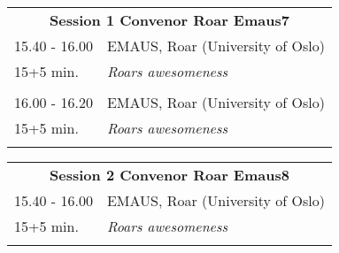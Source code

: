 \begin{table}[h!]
\begin{tabular}{p{3cm}p{13cm}}
\multicolumn{2}{c}{{\bf Session 1  \hfill Convenor Roar Emaus7}}\\ 
 15.40 - 16.00 & EMAUS, Roar (University of Oslo)\\ 
15+5 min. & {\it Roars awesomeness}\\ 
 & \\ 16.00 - 16.20 & EMAUS, Roar (University of Oslo)\\ 
15+5 min. & {\it Roars awesomeness}\\ 
 & \\ \end{tabular}
\end{table}

\hspace*{-10cm}
\begin{table}[h!]
\begin{tabular}{p{3cm}p{13cm}}
\multicolumn{2}{c}{{\bf Session 2  \hfill Convenor Roar Emaus8}}\\ 
 15.40 - 16.00 & EMAUS, Roar (University of Oslo)\\ 
15+5 min. & {\it Roars awesomeness}\\ 
 & \\ \end{tabular}
\end{table}

\hspace*{-10cm}
